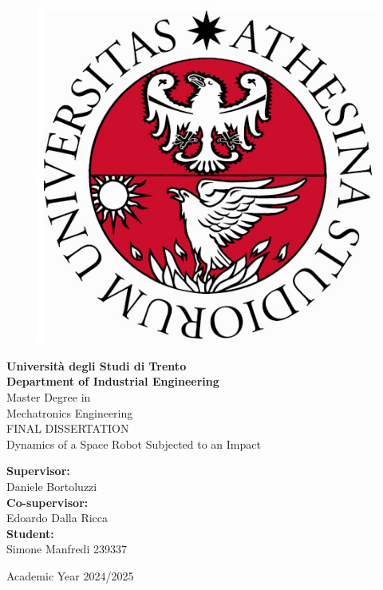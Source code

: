 \documentclass[a4paper,12pt,oneside]{report}
\begin{document}
\begin{titlepage}

\begin{figure}
\centering
\includegraphics[scale=0.25]{sigillo2}
\end{figure}

\begin{center}
\LARGE{\textbf{Università degli Studi di Trento\\ Department of Industrial Engineering}}\\
\vspace{10mm}
\Large{Master Degree in\\ Mechatronics Engineering}\\
\vspace{7mm}
\uppercase{Final Dissertation}
\vspace{7mm}\\
\huge{Dynamics of a Space Robot Subjected to an Impact}
\end{center}

\vspace{8mm}
\begin{flushleft}
\large{\textbf{Supervisor:}\\ Daniele Bortoluzzi}\\
\vspace{3mm}
\large{\textbf{Co-supervisor:}\\ Edoardo Dalla Ricca}\\
\vspace{3mm}
\large{\textbf{Student:}\\ Simone Manfredi 239337}\\
\end{flushleft}

\vspace{20mm}
\begin{center}
\Large{Academic Year 2024/2025}
\end{center}

\end{titlepage}
\end{document}
